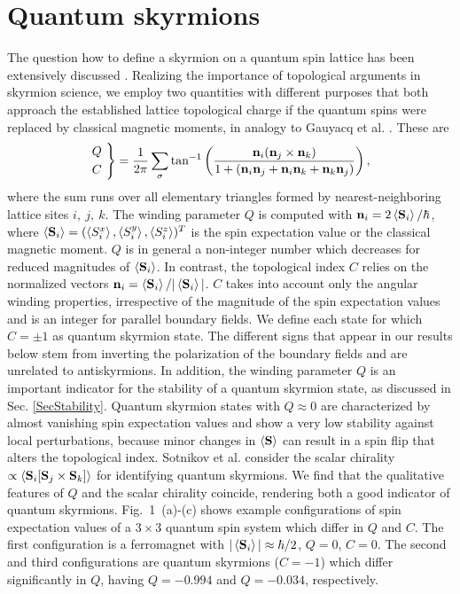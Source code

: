 \documentclass[reprint,aps,prb,superscriptaddress,10pt]{revtex4-2} %
\begin{document}
\section{Quantum skyrmions}\label{SecQSK}
The question how to define a skyrmion on a quantum spin lattice has been extensively discussed \cite{Lohani2019a,Gauyacq2019a,Sotnikov2021}.
%
Realizing the importance of topological arguments in skyrmion science, we employ two quantities with different purposes that both approach the established lattice topological charge \cite{Berg1981} if the quantum spins were replaced by classical magnetic moments, in analogy to Gauyacq et al. \cite{Gauyacq2019a}. These are
%
\begin{equation}
\begin{rcases}
Q~ \\ 
C~
\end{rcases}
=\frac{1}{2\pi}\sum_{\sigma}\tan^{-1}\left(\frac{\textbf{n}_i(\textbf{n}_j\times\textbf{n}_k)}{1+(\textbf{n}_i\textbf{n}_j+\textbf{n}_i\textbf{n}_k+\textbf{n}_k\textbf{n}_j)}\right),
\end{equation}
where the sum runs over all elementary triangles formed by nearest-neighboring lattice sites $i,~j,~k$.
The winding parameter $Q$ is computed with 
$\textbf{n}_i=2\braket{\textbf{S}_i}/\hbar$,
where $\braket{\textbf{S}_i}=(\braket{S_i^x},\braket{S_i^y},\braket{S_i^z})^T$ is the spin expectation value or the classical magnetic moment. $Q$ is in general a non-integer number which decreases for reduced magnitudes of $\braket{\textbf{S}_i}$.
In contrast, the topological index $C$ relies on the normalized vectors
$\textbf{n}_i=\braket{\textbf{S}_i}/|\braket{\textbf{S}_i}|$. $C$ takes into account only the angular winding properties, irrespective of the magnitude of the spin expectation values and is an integer for parallel boundary fields.
We define each state for which $C=\pm1$ as quantum skyrmion state. The different signs that appear in our results below stem from inverting the polarization of the boundary fields and are unrelated to antiskyrmions.
In addition, the winding parameter $Q$ is an important indicator for the stability of a quantum skyrmion state, as discussed in Sec. \ref{SecStability}.  Quantum skyrmion states with $Q\approx0$ are characterized by almost vanishing spin expectation values and show a very low stability against local perturbations, because minor changes in $\braket{\textbf{S}}$ can result in a spin flip that alters the topological index.
Sotnikov et al. \cite{Sotnikov2021} consider the scalar chirality $\propto\braket{\textbf{S}_i[\textbf{S}_j\times\textbf{S}_k]}$ for identifying quantum skyrmions.  We find that the qualitative features of $Q$ and the scalar chirality coincide, rendering both a good indicator of quantum skyrmions.
Fig.~1~(a)-(c) shows example configurations of spin expectation values of a $3\times3$ quantum spin system which differ in $Q$ and $C$. The first configuration is a ferromagnet with $|\braket{\textbf{S}_i}|\approx\hbar/2$, $Q=0$, $C=0$. 
The second and third configurations are quantum skyrmions ($C=-1$) which differ significantly in $Q$, having $Q=-0.994$ and $Q=-0.034$, respectively. \\
\end{document}
